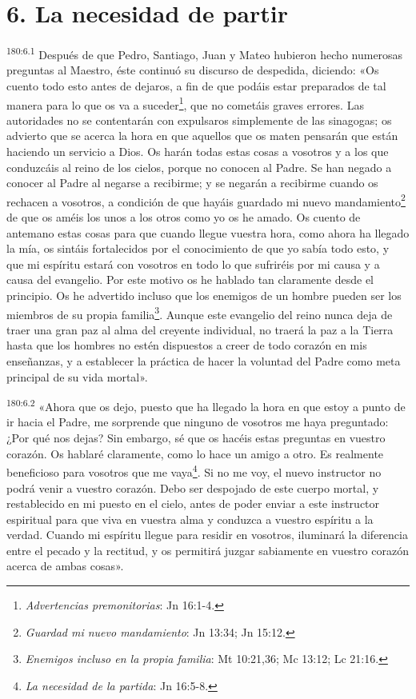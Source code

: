 \section*{6. La necesidad de partir}
\par
\textsuperscript{180:6.1} Después de que Pedro, Santiago, Juan y Mateo hubieron hecho numerosas preguntas al Maestro, éste continuó su discurso de despedida, diciendo: «Os cuento todo esto antes de dejaros, a fin de que podáis estar preparados de tal manera para lo que os va a suceder\footnote{\textit{Advertencias premonitorias}: Jn 16:1-4.}, que no cometáis graves errores. Las autoridades no se contentarán con expulsaros simplemente de las sinagogas; os advierto que se acerca la hora en que aquellos que os maten pensarán que están haciendo un servicio a Dios. Os harán todas estas cosas a vosotros y a los que conduzcáis al reino de los cielos, porque no conocen al Padre. Se han negado a conocer al Padre al negarse a recibirme; y se negarán a recibirme cuando os rechacen a vosotros, a condición de que hayáis guardado mi nuevo mandamiento\footnote{\textit{Guardad mi nuevo mandamiento}: Jn 13:34; Jn 15:12.} de que os améis los unos a los otros como yo os he amado. Os cuento de antemano estas cosas para que cuando llegue vuestra hora, como ahora ha llegado la mía, os sintáis fortalecidos por el conocimiento de que yo sabía todo esto, y que mi espíritu estará con vosotros en todo lo que sufriréis por mi causa y a causa del evangelio. Por este motivo os he hablado tan claramente desde el principio. Os he advertido incluso que los enemigos de un hombre pueden ser los miembros de su propia familia\footnote{\textit{Enemigos incluso en la propia familia}: Mt 10:21,36; Mc 13:12; Lc 21:16.}. Aunque este evangelio del reino nunca deja de traer una gran paz al alma del creyente individual, no traerá la paz a la Tierra hasta que los hombres no estén dispuestos a creer de todo corazón en mis enseñanzas, y a establecer la práctica de hacer la voluntad del Padre como meta principal de su vida mortal».

\par
\textsuperscript{180:6.2} «Ahora que os dejo, puesto que ha llegado la hora en que estoy a punto de ir hacia el Padre, me sorprende que ninguno de vosotros me haya preguntado: ¿Por qué nos dejas? Sin embargo, sé que os hacéis estas preguntas en vuestro corazón. Os hablaré claramente, como lo hace un amigo a otro. Es realmente beneficioso para vosotros que me vaya\footnote{\textit{La necesidad de la partida}: Jn 16:5-8.}. Si no me voy, el nuevo instructor no podrá venir a vuestro corazón. Debo ser despojado de este cuerpo mortal, y restablecido en mi puesto en el cielo, antes de poder enviar a este instructor espiritual para que viva en vuestra alma y conduzca a vuestro espíritu a la verdad. Cuando mi espíritu llegue para residir en vosotros, iluminará la diferencia entre el pecado y la rectitud, y os permitirá juzgar sabiamente en vuestro corazón acerca de ambas cosas».

